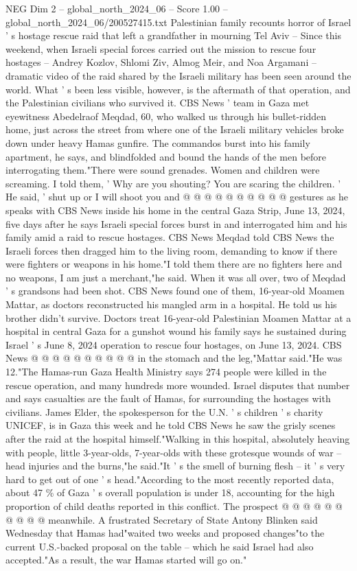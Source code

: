 \begin{textsample}{NEG Dim 2 – global\_north\_2024\_06 – Score 1.00 – global\_north\_2024\_06/200527415.txt}  \label{ex:f2_neg_132}
Palestinian family recounts horror of Israel ' s hostage rescue raid that left a grandfather in mourning Tel Aviv -- Since this weekend, when Israeli special forces carried out the mission to rescue four hostages -- Andrey Kozlov, Shlomi Ziv, Almog Meir, and Noa Argamani -- dramatic video of the raid shared by the Israeli military has been seen around the world.
What ' s been less visible, however, is the aftermath of that operation, and the Palestinian civilians who survived it.
CBS News ' team in Gaza met eyewitness Abedelraof Meqdad, 60, who walked us through his bullet-ridden home, just across the street from where one of the Israeli military vehicles broke down under heavy Hamas gunfire.
The commandos burst into his family apartment, he says, and blindfolded and bound the hands of the men before interrogating them."There were sound grenades.
Women and children were screaming.
I told them, ' Why are you shouting?
You are scaring the children. ' He said, ' shut up or I will shoot you and @ @ @ @ @ @ @ @ @ @ gestures as he speaks with CBS News inside his home in the central Gaza Strip, June 13, 2024, five days after he says Israeli special forces burst in and interrogated him and his family amid a raid to rescue hostages.
CBS News Meqdad told CBS News the Israeli forces then dragged him to the living room, demanding to know if there were fighters or weapons in his home."I told them there are no fighters here and no weapons, I am just a merchant,"he said.
When it was all over, two of Meqdad ' s grandsons had been shot.
CBS News found one of them, 16-year-old Moamen Mattar, as doctors reconstructed his mangled arm in a hospital.
He told us his brother didn't survive.
Doctors treat 16-year-old Palestinian Moamen Mattar at a hospital in central Gaza for a gunshot wound his family says he sustained during Israel ' s June 8, 2024 operation to rescue four hostages, on June 13, 2024.
CBS News @ @ @ @ @ @ @ @ @ @ in the stomach and the leg,"Mattar said."He was 12."The Hamas-run Gaza Health Ministry says 274 people were killed in the rescue operation, and many hundreds more wounded.
Israel disputes that number and says casualties are the fault of Hamas, for surrounding the hostages with civilians.
James Elder, the spokesperson for the U.N. ' s children ' s charity UNICEF, is in Gaza this week and he told CBS News he saw the grisly scenes after the raid at the hospital himself."Walking in this hospital, absolutely heaving with people, little 3-year-olds, 7-year-olds with these grotesque wounds of war -- head injuries and the burns,"he said."It ' s the smell of burning flesh -- it ' s very hard to get out of one ' s head."According to the most recently reported data, about 47 \% of Gaza ' s overall population is under 18, accounting for the high proportion of child deaths reported in this conflict.
The prospect @ @ @ @ @ @ @ @ @ @ meanwhile.
A frustrated Secretary of State Antony Blinken said Wednesday that Hamas had"waited two weeks and proposed changes"to the current U.S.-backed proposal on the table -- which he said Israel had also accepted."As a result, the war Hamas started will go on."

\end{textsample}
